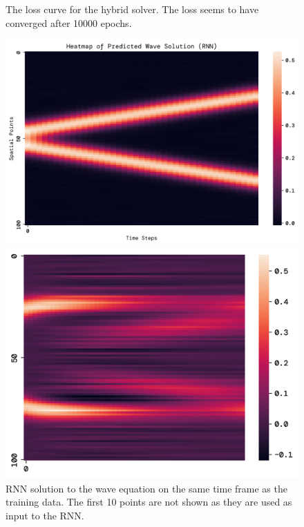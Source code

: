 \documentclass[twoside,11pt]{report}
\begin{document}
\begin{figure}[!ht]
\begin{minipage}[t]{0.5\textwidth - 1mm}
\begin{center}
            \end{center}
            \caption
            {
                The loss curve for the hybrid solver. The loss seems to have converged after 10000 epochs.
            }\label{fig:wave_tf_dnn}
        \end{minipage}
    \end{figure}
    \begin{figure}[!ht]
        \begin{minipage}[t]{0.5\textwidth - 1mm}
            \begin{center}
                \includegraphics[width=\textwidth]{../runsAndFigures/wave_rnn.png}
            \end{center}
            \caption
            {
                RNN solution to the wave equation on the same time frame as the training data. 
                The first 10 points are not shown as they are used as input to the RNN.
            }\label{fig:wave_own_dnn}
        \end{minipage}
        \hspace{2mm}
        \begin{minipage}[t]{0.5\textwidth - 1mm}
            \begin{center}
                \includegraphics[width=\textwidth]{../runsAndFigures/wave_rnn_future.png}

\end{center}
\end{minipage}
\end{figure}
\end{document}
